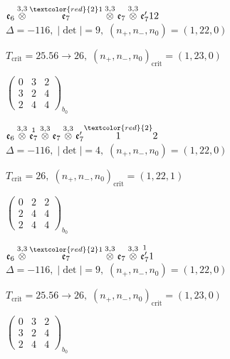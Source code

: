 \documentclass[10pt]{article}
\begin{document}
\smallskip

$\mathfrak{e}_6\overset{3,3}{\otimes}\overset{\textcolor{red}{2}1}{\mathfrak{e}_7}\overset{3,3}{\otimes}\mathfrak{e}_7\overset{3,3}{\otimes}\mathfrak{e}_7'12$ \quad $\Delta=-116,\; |\det|=9,\; (n_+,n_-,n_0)=(1,22,0)$

\hspace{1em}$T_{\text{crit}}=25.56 \to 26,\; (n_+,n_-,n_0)_{\text{crit}}=(1,23,0)$

\hspace{2em}$\left(\begin{smallmatrix}0 & 3 & 2 \\ 3 & 2 & 4 \\ 2 & 4 & 4\end{smallmatrix}\right)_{\!b_0}$

$\mathfrak{e}_6\overset{3,3}{\otimes}\overset{1}{\mathfrak{e}_7}\overset{3,3}{\otimes}\mathfrak{e}_7\overset{3,3}{\otimes}\mathfrak{e}_7'\overset{\textcolor{red}{2}}{1}2$ \quad $\Delta=-116,\; |\det|=4,\; (n_+,n_-,n_0)=(1,22,0)$

\hspace{1em}$T_{\text{crit}}=26,\; (n_+,n_-,n_0)_{\text{crit}}=(1,22,1)$

\hspace{2em}$\left(\begin{smallmatrix}0 & 2 & 2 \\ 2 & 4 & 4 \\ 2 & 4 & 4\end{smallmatrix}\right)_{\!b_0}$

\smallskip

$\mathfrak{e}_6\overset{3,3}{\otimes}\overset{\textcolor{red}{2}1}{\mathfrak{e}_7}\overset{3,3}{\otimes}\mathfrak{e}_7\overset{3,3}{\otimes}\overset{1}{\mathfrak{e}_7'}1$ \quad $\Delta=-116,\; |\det|=9,\; (n_+,n_-,n_0)=(1,22,0)$

\hspace{1em}$T_{\text{crit}}=25.56 \to 26,\; (n_+,n_-,n_0)_{\text{crit}}=(1,23,0)$

\hspace{2em}$\left(\begin{smallmatrix}0 & 3 & 2 \\ 3 & 2 & 4 \\ 2 & 4 & 4\end{smallmatrix}\right)_{\!b_0}$
\end{document}
